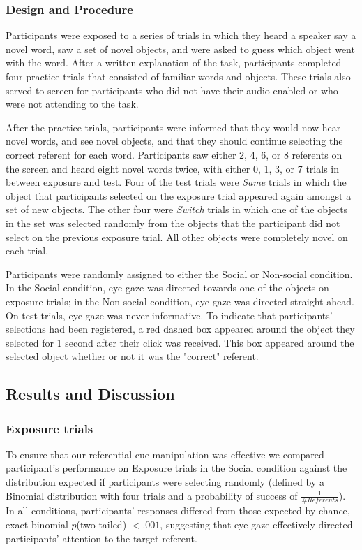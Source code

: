 \documentclass[10pt,letterpaper]{article}
\begin{document}
\subsubsection{Design and Procedure}

Participants were exposed to a series of trials in which they heard a speaker say a novel word, 
saw a set of novel objects, and were asked to guess which object went with the word. 
After a written explanation of the task, participants completed four practice trials that consisted of 
familiar words and objects. These trials also served to screen for participants
who did not have their audio enabled or who were not attending to the task.

After the practice trials, participants were informed that they would now hear
novel words, and see novel objects, and that they should continue selecting the correct
referent for each word. Participants saw either 2, 4, 6, or 8 referents on
the screen and heard eight novel words twice, with either 0, 1, 3, or 7 trials in between exposure and test. Four of the test trials were \textit{Same} trials in which the object that participants selected on the exposure trial appeared again amongst a set of new objects. 
The other four were \textit{Switch} trials in which one of the objects in the set was selected 
randomly from the objects that the participant did not select on the previous exposure trial. 
All other objects were completely novel on each trial. 

Participants were randomly assigned to either the Social or Non-social condition. In the Social condition, eye gaze was directed towards one of the objects on exposure trials; in the Non-social condition, eye gaze was directed straight ahead. On test trials, eye gaze was never informative. To indicate that participants' selections had been registered, a red dashed box appeared around the object they selected for 1 second after their click was received. This box appeared around the selected object whether or not it was the "correct" referent.

\subsection{Results and Discussion}

\subsubsection{Exposure trials}

To ensure that our referential cue manipulation was effective we compared participant's performance on Exposure trials in the Social condition against the distribution expected if participants were selecting randomly (defined by a Binomial distribution with four trials and a probability of success of $\frac{1}{\# Referents}$). In all conditions, participants' responses differed from those expected by chance, exact binomial  $p$(two-tailed) $< .001$, suggesting that eye gaze effectively directed participants' attention to the target referent. 
\end{document}
